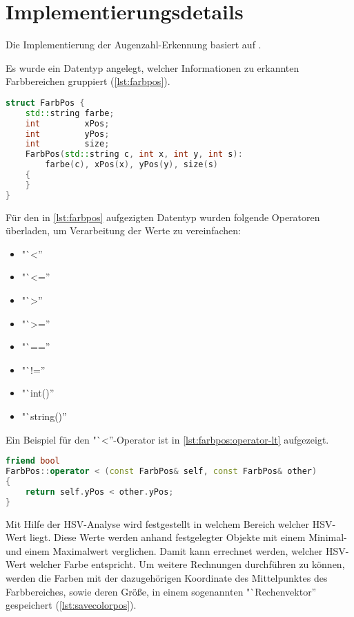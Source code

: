     \section{Implementierungsdetails}

        Die Implementierung der Augenzahl-Erkennung basiert auf
        \cite{github:motbox}.

        Es wurde ein Datentyp angelegt, welcher Informationen zu erkannten
        Farbbereichen gruppiert (\ref{lst:farbpos}).

\begin{lstlisting}[language=c++,
                   caption={Typ: "`FarbPos''},
                   label={lst:farbpos}]
struct FarbPos {
    std::string farbe;
    int         xPos;
    int         yPos;
    int         size;
    FarbPos(std::string c, int x, int y, int s):
        farbe(c), xPos(x), yPos(y), size(s)
    {
    }
}
\end{lstlisting}

        Für den in \autoref{lst:farbpos} aufgezigten Datentyp wurden folgende
        Operatoren überladen, um Verarbeitung der Werte zu vereinfachen:
        \begin{itemize}
            \item "`<''
            \item "`<=''
            \item "`>''
            \item "`>=''
            \item "`==''
            \item "`!=''
            \item "`int()''
            \item "`string()''
        \end{itemize}

        Ein Beispiel für den "`<''-Operator ist in
        \autoref{lst:farbpos:operator-lt} aufgezeigt.

\begin{lstlisting}[language=c++,
                   caption={Beispiel: Implementation "`FarbPos::operator<''},
                   label={lst:farbpos:operator-lt}]
friend bool
FarbPos::operator < (const FarbPos& self, const FarbPos& other)
{
    return self.yPos < other.yPos;
}
\end{lstlisting}

        Mit Hilfe der \ac{HSV}-Analyse wird festgestellt in welchem Bereich
        welcher \ac{HSV}-Wert liegt.
        Diese Werte werden anhand festgelegter Objekte mit einem Minimal- und
        einem Maximalwert verglichen.
        Damit kann errechnet werden, welcher \ac{HSV}-Wert welcher Farbe
        entspricht.
        Um weitere Rechnungen durchführen zu können, werden die Farben mit der
        dazugehörigen Koordinate des Mittelpunktes des Farbbereiches, sowie
        deren Größe, in einem sogenannten "`Rechenvektor'' gespeichert
        (\autoref{lst:savecolorpos}).

